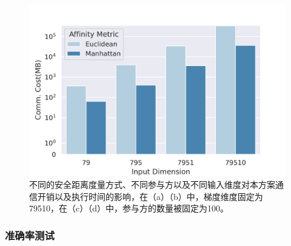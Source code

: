 \begin{figure}[htb]
{\begin{minipage}[b]{0.45\textwidth}
			\includegraphics[scale=0.45]{figs/overheads/comm-dimension-100.png}
		\end{minipage}
	}
	\qquad
	\caption[方案效率评估]{不同的安全距离度量方式、不同参与方以及不同输入维度对本方案通信开销以及执行时间的影响，在（a）（b）中，梯度维度固定为79510，在（c）（d）中，参与方的数量被固定为100。}
	\label{fig-cost}
\end{figure}

\subsubsection{准确率测试}

